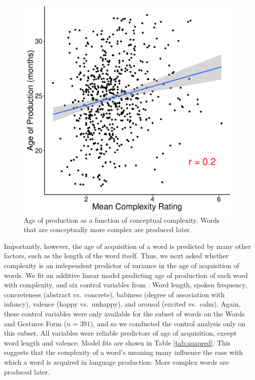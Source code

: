 \begin{figure}[t!]
\begin{center}
\includegraphics[scale = .5]{figs/chap4_aoa.pdf}
\end{center}
\caption{Age of production as a function of conceptual complexity. Words that are conceptually more complex are produced later.}
\label{fig:study3aoa}
\end{figure}


Importantly, however, the age of acquisition of a word is predicted by many other factors, such as the length of the word itself. Thus, we next asked whether complexity is an independent predictor of variance in the age of acquisition of words. We fit an additive linear model predicting age of production of each word with complexity, and six control variables from : Word length, spoken frequency, concreteness (abstract vs.\ concrete), babiness (degree of association with infancy), valence (happy vs.\ unhappy), and arousal (excited vs.\ calm).  Again, these control variables were only available for the subset of words on the Words and Gestures Form ($n = 391$), and so we conducted the control analysis only on this subset. All variables were reliable predictors of age of acquisition, except word length and valence. Model fits are shown in Table \ref{tab:aoapred}. This suggests that the complexity of a word's meaning many influence the ease with which a word is acquired in language production: More complex words are produced later.


